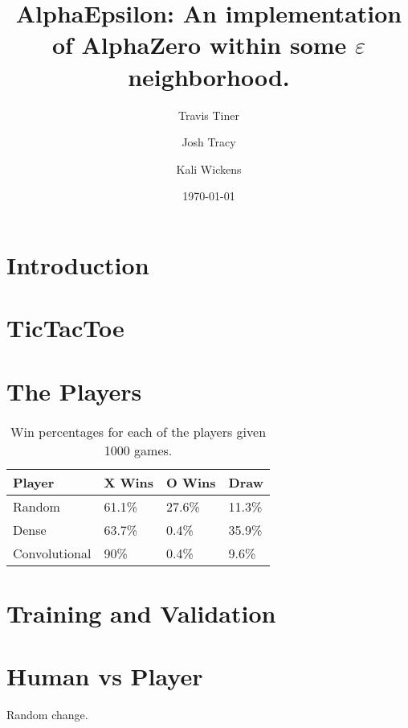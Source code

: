 \documentclass[11pt]{article}
\title{AlphaEpsilon: An implementation of AlphaZero within some $\varepsilon$ neighborhood.}
\author{Travis Tiner}
\author{Josh Tracy}
\author{Kali Wickens}
\affil{University of Utah -- Deep Learning}
\date{\today}
\begin{document}
\maketitle

\section{Introduction}

	

\section{TicTacToe}

	

\section{The Players}

	
	
	

\begin{table}[]
	\centering
	\begin{tabular}{llll}
	\hline
	\textbf{Player} & \textbf{X Wins} & \textbf{O Wins} & \textbf{Draw} \\ \hline
	Random          & 61.1\%          & 27.6\%          & 11.3\%        \\
	Dense           & 63.7\%          & 0.4\%           & 35.9\%        \\
	Convolutional   & 90\%            & 0.4\%           & 9.6\%         \\ \hline
	\end{tabular}
	\caption{Win percentages for each of the players given 1000 games.}
\end{table}

\section{Training and Validation}

	

\section{Human vs Player}

	

	Random change.

%
%
%
%
%
\end{document}
